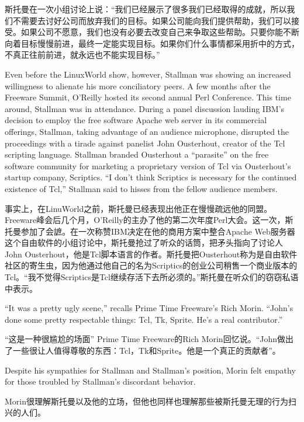 \ifdefined\chs
斯托曼在一次小组讨论上说：``我们已经展示了很多我们已经取得的成就，所以我们不需要去讨好公司而放弃我们的目标。如果公司能向我们提供帮助，我们可以接受。如果公司不愿意，我们也没有必要去改变自己来争取这些帮助。只要你能不断向着目标慢慢前进，最终一定能实现目标。如果你们什么事情都采用折中的方式，不真正往前前进，就永远也不能实现目标。''
\fi

\ifdefined\eng
Even before the LinuxWorld show, however, Stallman was showing an increased willingness to alienate his more conciliatory peers. A few months after the Freeware Summit, O'Reilly hosted its second annual Perl Conference. This time around, Stallman was in attendance. During a panel discussion lauding IBM's decision to employ the free software Apache web server in its commercial offerings, Stallman, taking advantage of an audience microphone, disrupted the proceedings with a tirade against panelist John Ousterhout, creator of the Tcl scripting language. Stallman branded Ousterhout a ``parasite'' on the free software community for marketing a proprietary version of Tcl via Ousterhout's startup company, Scriptics. ``I don't think Scriptics is necessary for the continued existence of Tcl,'' Stallman said to hisses from the fellow audience members.\endnote{}
\fi

\ifdefined\chs
事实上，在LinuWorld之前，斯托曼已经表现出他正在慢慢疏远他的同盟。Freeware峰会后几个月，O'Reilly的主办了他的第二次年度Perl大会。这一次，斯托曼参加了会謶。在一次称赞IBM决定在他的商用方案中整合Apache Web服务器这个自由软件的小组讨论中，斯托曼抢过了听众的话筒，把矛头指向了讨论人John Ousterhout，他是Tcl脚本语言的作者。斯托曼把Ousterhout称为是自由软件社区的寄生虫，因为他通过他自己的名为Scriptics的创业公司稍售一个商业版本的Tcl。``我不觉得Scriptics是Tcl继续存活下去所必须的。''斯托曼在听众们的窃窃私语中表示。\endnote{}
\fi

\ifdefined\eng
``It was a pretty ugly scene,'' recalls Prime Time Freeware's Rich Morin. ``John's done some pretty respectable things: Tcl, Tk, Sprite. He's a real contributor.''
\fi

\ifdefined\chs
``这是一种很尴尬的场面'' Prime Time Freeware的Rich Morin回忆说。``John做出了一些很让人值得尊敬的东西：Tcl，Tk和Sprite。他是一个真正的贡献者''。
\fi

\ifdefined\eng
Despite his sympathies for Stallman and Stallman's position, Morin felt empathy for those troubled by Stallman's discordant behavior.
\fi

\ifdefined\chs
Morin很理解斯托曼以及他的立场，但他也同样也理解那些被斯托曼无理的行为扫兴的人们。
\fi

